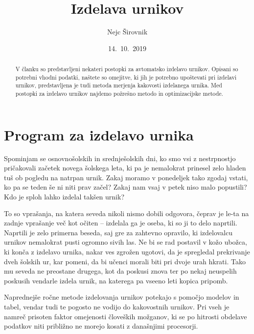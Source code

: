 \documentclass[a4paper,10pt]{article}
\begin{document}
\title{Izdelava urnikov}
\author{Nejc Širovnik}
\date{14.~10.~2019}
\maketitle

\begin{abstract}
V članku so predstavljeni nekateri postopki za avtomatsko izdelavo urnikov. Opisani so
potrebni vhodni podatki, naštete so omejitve, ki jih je potrebno upoštevati pri izdelavi
urnikov, predstavljena je tudi metoda merjenja kakovosti izdelanega urnika. Med postopki za izdelavo
urnikov najdemo požrešno metodo in optimizacijske metode.
\end{abstract}

\section{Program za izdelavo urnika}

Spominjam se osnovnošolskih in srednješolskih dni, ko smo vsi z nestrpnostjo pričakovali
začetek novega šolskega leta, ki pa je nemalokrat prinesel zelo hladen tuš ob pogledu na
natrpan urnik. Zakaj moramo v ponedeljek tako zgodaj vstati, ko pa se teden še ni niti
prav začel? Zakaj nam vsaj v petek niso malo popustili? Kdo je sploh lahko izdelal
takšen urnik?

To so vprašanja, na katera seveda nikoli nismo dobili odgovora, čeprav je le-ta na zadnje
vprašanje več kot očiten -- izdelala ga je oseba, ki so ji to delo naprtili. Naprtili je
zelo primerna beseda, saj gre za zahtevno opravilo, ki izdelovalcu urnikov nemalokrat
pusti ogromno sivih las. Ne bi se rad postavil v kožo ubožca, ki konča z izdelavo urnika,
nakar ves zgrožen ugotovi, da je spregledal prekrivanje dveh šolskih ur, kar pomeni, da
bi učenci morali biti pri dvoje urah hkrati. Tako mu seveda ne preostane drugega, kot da
poskusi znova ter po nekaj neuspelih poskusih vendarle izdela urnik, na katerega pa vseeno
leti kopica pripomb.

Naprednejše ročne metode izdelovanja urnikov potekajo s pomočjo modelov in tabel, vendar
tudi te pogosto ne vodijo do kakovostnih urnikov. Pri vseh je namreč prisoten faktor
omejenosti človeških možganov, ki se po hitrosti obdelave podatkov niti približno ne
morejo kosati z današnjimi procesorji.
\end{document}
